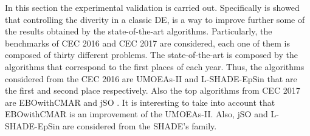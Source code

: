 In this section the experimental validation is carried out.
%
Specifically is showed that controlling the diverity in a classic DE, is a way to improve further some of the results obtained by the state-of-the-art algorithms.
%
Particularly, the benchmarks of CEC 2016 and CEC 2017 are considered, each one of them is composed of thirty different problems.
%
The state-of-the-art is composed by the algorithms that correspond to the first places of each year.
%
Thus, the algorithms considered from the CEC 2016 are UMOEAs-II \cite{elsayed2016testing} and L-SHADE-EpSin \cite{awad2016ensemble} that are the first and second place respectively.
%
Also the top algorithms from CEC 2017 are EBOwithCMAR \cite{kumar2017improving} and jSO \cite{brest2017single}.
%
It is interesting to take into account that EBOwithCMAR is an improvement of the UMOEAs-II.
%
Also, jSO and L-SHADE-EpSin are considered from the SHADE's family.


